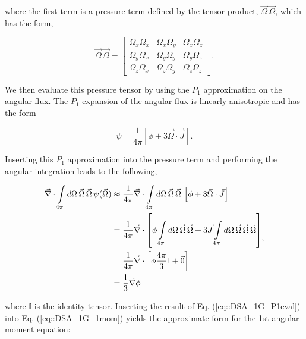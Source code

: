 \noindent where the first term is a pressure term defined by the tensor product, $ \vec{\Omega} \, \vec{\Omega}$, which has the form,

\begin{equation}
\label{eq::DSA_1G_TP}
\vec{\Omega}\, \vec{\Omega}  =    \left[
\begin{array}{ccc}
\Omega_x \Omega_x & \Omega_x \Omega_y & \Omega_x \Omega_z \\
\Omega_y \Omega_x & \Omega_y \Omega_y & \Omega_y \Omega_z \\
\Omega_z \Omega_x & \Omega_z \Omega_y & \Omega_z \Omega_z 
\end{array}
\right] .
\end{equation}

\noindent We then evaluate this pressure tensor by using the $P_1$ approximation on the angular flux. The $P_1$ expansion of the angular flux is linearly anisotropic and has the form

\begin{equation}
\label{eq::DSA_1G_P1approx}
\psi = \frac{1}{4 \pi} \left[ \phi + 3 \vec{\Omega} \cdot \vec{J}  \right].
\end{equation}

\noindent Inserting this $P_1$ approximation into the pressure term and performing the angular integration leads to the following,

\begin{equation}
\label{eq::DSA_1G_P1eval}
\begin{aligned}
\vec{\nabla} \cdot  \int\displaylimits_{4 \pi}  d \Omega \, \vec{\Omega}\, \vec{\Omega} \, \psi (\vec{\Omega}) &\approx \frac{1}{4 \pi} \vec{\nabla} \cdot \int\displaylimits_{4 \pi}  d \Omega \, \vec{\Omega}\, \vec{\Omega} \, \left[ \phi + 3 \vec{\Omega} \cdot \vec{J} \right] \\
&= \frac{1}{4 \pi} \vec{\nabla} \cdot \left[  \phi  \int\displaylimits_{4 \pi}  d \Omega \, \vec{\Omega}\, \vec{\Omega}    + 3 \vec{J}  \int\displaylimits_{4 \pi}  d \Omega \, \vec{\Omega}\, \vec{\Omega} \, \vec{\Omega}   \right] \\
&= \frac{1}{4 \pi} \vec{\nabla} \cdot \left[ \phi  \frac{4 \pi}{3} \mathbb{I} + \vec{0} \right] \\
&= \frac{1}{3} \vec{\nabla} \phi
\end{aligned} ,
\end{equation}

\noindent where $\mathbb{I}$ is the identity tensor. Inserting the result of Eq. (\ref{eq::DSA_1G_P1eval}) into Eq. (\ref{eq::DSA_1G_1mom}) yields the approximate form for the 1st angular moment equation:

